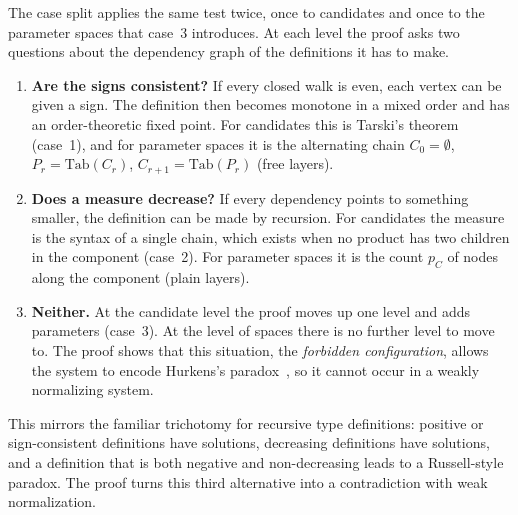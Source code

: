 \documentclass[10pt]{article}
\begin{document}
The case split applies the same test twice, once to candidates and once to the
parameter spaces that case~3 introduces. At each level the proof asks two questions
about the dependency graph of the definitions it has to make.
\begin{enumerate}
\item \textbf{Are the signs consistent?} If every closed walk is even, each vertex
  can be given a sign. The definition then becomes monotone in a mixed order and has
  an order-theoretic fixed point. For candidates this is Tarski's
  theorem~\cite{Tarski1955} (case~1), and for parameter spaces it is the alternating
  chain $C_0=\emptyset$, $P_r=\mathrm{Tab}(C_r)$, $C_{r+1}=\mathrm{Tab}(P_r)$ (free
  layers).
\item \textbf{Does a measure decrease?} If every dependency points to something
  smaller, the definition can be made by recursion. For candidates the measure is
  the syntax of a single chain, which exists when no product has two children in
  the component (case~2). For parameter spaces it is the count $p_C$ of nodes along
  the component (plain layers).
\item \textbf{Neither.} At the candidate level the proof moves up one level and adds
  parameters (case~3). At the level of spaces there is no further level to move to.
  The proof shows that this situation, the \emph{forbidden configuration}, allows
  the system to encode Hurkens's paradox~\cite{Hurkens1995}, so it cannot occur in a
  weakly normalizing system.
\end{enumerate}
This mirrors the familiar trichotomy for recursive type definitions: positive or
sign-consistent definitions have solutions, decreasing definitions have solutions,
and a definition that is both negative and non-decreasing leads to a Russell-style
paradox. The proof turns this third alternative into a contradiction with weak
normalization.
\end{document}

